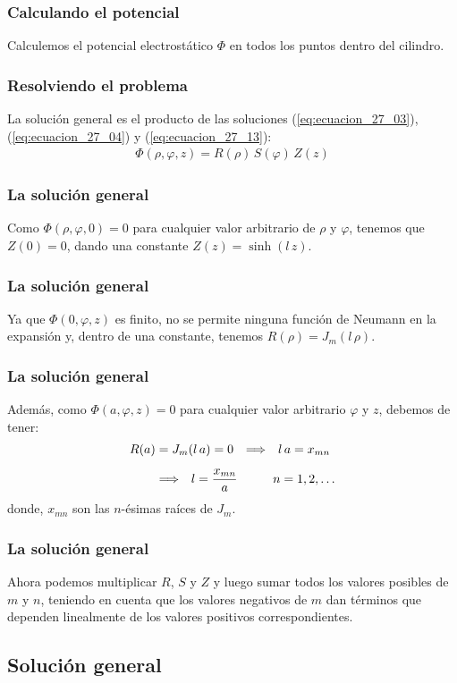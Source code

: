 \documentclass[12pt]{beamer}
\begin{document}
\begin{frame}
\frametitle{Calculando el potencial}
Calculemos el potencial electrostático $\Phi$ en todos los puntos dentro del cilindro.
\end{frame}
\begin{frame}
\frametitle{Resolviendo el problema}
La solución general es el producto de las soluciones (\ref{eq:ecuacion_27_03}), (\ref{eq:ecuacion_27_04}) y (\ref{eq:ecuacion_27_13}):
\pause
\begin{align*}
\Phi (\rho, \varphi, z) = R(\rho) \, S(\varphi) \, Z(z)
\end{align*}
\end{frame}
\begin{frame}
\frametitle{La solución general}
Como $\Phi (\rho, \varphi, 0) = 0$ para cualquier valor arbitrario de $\rho$ y $\varphi$, \pause tenemos que $Z(0) = 0$, dando una constante $Z(z) = \sinh (l \, z)$.
\end{frame}
\begin{frame}
\frametitle{La solución general}
Ya que $\Phi (0, \varphi, z)$ es finito, \pause no se permite ninguna función de Neumann en la expansión y, dentro de una constante, tenemos $R (\rho) = J_{m}(l \, \rho)$.
\end{frame}
\begin{frame}
\frametitle{La solución general}
Además, como $\Phi (a, \varphi, z) = 0$ para cualquier valor arbitrario $\varphi$ y $z$, debemos de tener:
\pause
\begin{align*}
R (a) &= J_{m} (l \, a) = 0 \hspace{0.25cm} \Longrightarrow \hspace{0.25cm} l \, a = x_{mn} \\[0.5em]
&\Longrightarrow \hspace{0.25cm} l = \dfrac{x_{mn}}{a} \hspace{1cm} n = 1, 2, \ldots
\end{align*}
donde, $x_{mn}$ son las $n$-ésimas raíces de $J_{m}$.
\end{frame}
\begin{frame}
\frametitle{La solución general}
Ahora podemos multiplicar $R$, $S$ y $Z$ y luego sumar todos los valores posibles de $m$ y $n$, teniendo en cuenta que los valores negativos de $m$ dan términos que dependen linealmente de los valores positivos correspondientes.
\end{frame}

\subsection{Solución general}
\end{document}
